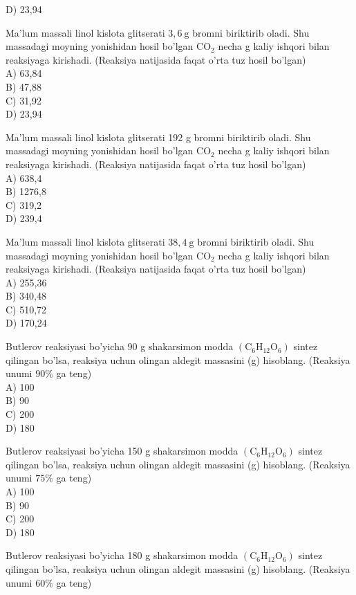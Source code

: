 D) 23,94
  \item Ma'lum massali linol kislota glitserati $3,6 \mathrm{~g}$ bromni biriktirib oladi. Shu massadagi moyning yonishidan hosil bo'lgan $\mathrm{CO}_{2}$ necha g kaliy ishqori bilan reaksiyaga kirishadi. (Reaksiya natijasida faqat o'rta tuz hosil bo'lgan)\\
A) 63,84\\
B) 47,88\\
C) 31,92\\
D) 23,94
  \item Ma'lum massali linol kislota glitserati 192 g bromni biriktirib oladi. Shu massadagi moyning yonishidan hosil bo'lgan $\mathrm{CO}_{2}$ necha g kaliy ishqori bilan reaksiyaga kirishadi. (Reaksiya natijasida faqat o'rta tuz hosil bo'lgan)\\
A) 638,4\\
B) 1276,8\\
C) 319,2\\
D) 239,4
  \item Ma'lum massali linol kislota glitserati $38,4 \mathrm{~g}$ bromni biriktirib oladi. Shu massadagi moyning yonishidan hosil bo'lgan $\mathrm{CO}_{2}$ necha g kaliy ishqori bilan reaksiyaga kirishadi. (Reaksiya natijasida faqat o'rta tuz hosil bo'lgan)\\
A) 255,36\\
B) 340,48\\
C) 510,72\\
D) 170,24
  \item Butlerov reaksiyasi bo'yicha 90 g shakarsimon modda $\left(\mathrm{C}_{6} \mathrm{H}_{12} \mathrm{O}_{6}\right)$ sintez qilingan bo'lsa, reaksiya uchun olingan aldegit massasini (g) hisoblang. (Reaksiya unumi $90 \%$ ga teng)\\
A) 100\\
B) 90\\
C) 200\\
D) 180
  \item Butlerov reaksiyasi bo'yicha 150 g shakarsimon modda $\left(\mathrm{C}_{6} \mathrm{H}_{12} \mathrm{O}_{6}\right)$ sintez qilingan bo'lsa, reaksiya uchun olingan aldegit massasini (g) hisoblang. (Reaksiya unumi $75 \%$ ga teng)\\
A) 100\\
B) 90\\
C) 200\\
D) 180
  \item Butlerov reaksiyasi bo'yicha 180 g shakarsimon modda $\left(\mathrm{C}_{6} \mathrm{H}_{12} \mathrm{O}_{6}\right)$ sintez qilingan bo'lsa, reaksiya uchun olingan aldegit massasini (g) hisoblang. (Reaksiya unumi $60 \%$ ga teng)\\
